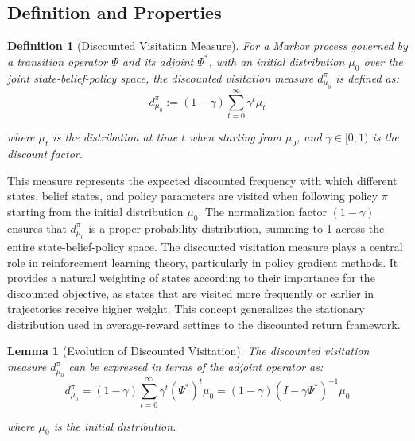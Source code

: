 \documentclass[a4paper,12pt]{report}
\newtheorem{lemma}{Lemma}
\newtheorem{definition}{Definition}
\begin{document}
\subsection{Definition and Properties}
\begin{definition}[Discounted Visitation Measure]
    For a Markov process governed by a transition operator $\Psi$ and its adjoint $\Psi
        ^{*}$, with an initial distribution $\mu_{0}$ over the joint state-belief-policy
    space, the discounted visitation measure $d^{\pi}_{\mu_0}$ is defined as:
    \begin{equation}
        d^{\pi}_{\mu_0}:= (1-\gamma) \sum_{t=0}^{\infty}\gamma^{t} \mu_{t}
    \end{equation}

    where $\mu_{t}$ is the distribution at time $t$ when starting from $\mu_{0}$,
    and $\gamma \in [0, 1)$ is the discount factor.
\end{definition}This measure represents the expected discounted frequency with which
different states, belief states, and policy parameters are visited when following
policy $\pi$ starting from the initial distribution $\mu_{0}$. The normalization
factor $(1-\gamma)$ ensures that $d^{\pi}_{\mu_0}$ is a proper probability
distribution, summing to 1 across the entire state-belief-policy space. The discounted
visitation measure plays a central role in reinforcement learning theory,
particularly in policy gradient methods. It provides a natural weighting of states
according to their importance for the discounted objective, as states that are
visited more frequently or earlier in trajectories receive higher weight. This concept
generalizes the stationary distribution used in average-reward settings to the discounted
return framework.
\begin{lemma}[Evolution of Discounted Visitation]
    The discounted visitation measure $d^{\pi}_{\mu_0}$ can be expressed in terms of
    the adjoint operator as:
    \begin{equation}
        d^{\pi}_{\mu_0}= (1-\gamma) \sum_{t=0}^{\infty}\gamma^{t} (\Psi^{*})^{t} \mu_{0}
        = (1-\gamma)(I - \gamma\Psi^{*})^{-1}\mu_{0}
    \end{equation}

    where $\mu_{0}$ is the initial distribution.
\end{lemma}
\end{document}
